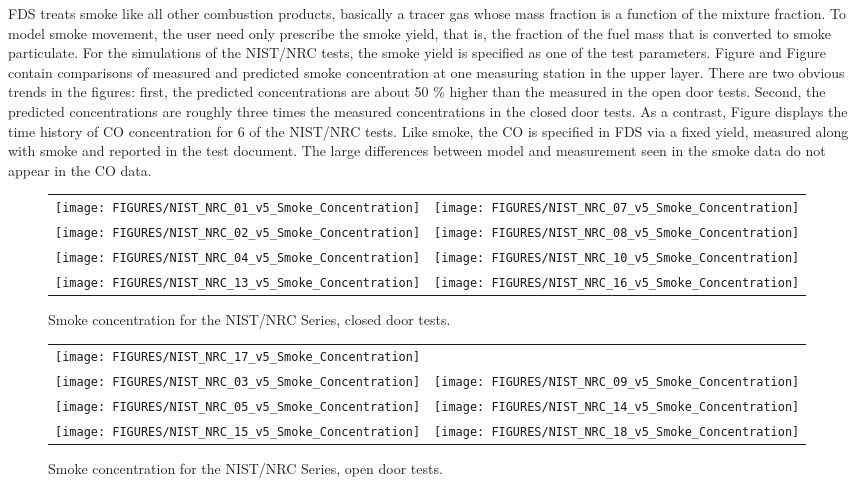FDS treats smoke like all other combustion products, basically a tracer gas whose mass fraction is a function of the mixture fraction.
To model smoke movement, the user need only prescribe the smoke yield, that is, the fraction of the fuel mass that is
converted to smoke particulate.  For the simulations of the NIST/NRC tests, the smoke yield is specified as one of the test parameters.
Figure and Figure contain comparisons of measured and predicted smoke concentration at one measuring station in the upper layer.
There are two obvious trends in the figures: first, the predicted concentrations are about 50 \% higher than the measured
in the open door tests.  Second,
the predicted concentrations are roughly three times the measured concentrations in the closed door tests.
As a contrast, Figure displays the time history of CO concentration for 6 of the NIST/NRC tests.
Like smoke, the CO is specified in FDS via a fixed yield, measured along with smoke and reported in the test document.
The large differences between model and measurement seen in the smoke data do not appear in the CO data.

\begin{figure}[p]
\begin{tabular*}{\textwidth}{l@{\extracolsep{\fill}}r}
\texttt{[image: FIGURES/NIST\_NRC\_01\_v5\_Smoke\_Concentration]} &
\texttt{[image: FIGURES/NIST\_NRC\_07\_v5\_Smoke\_Concentration]} \\
\texttt{[image: FIGURES/NIST\_NRC\_02\_v5\_Smoke\_Concentration]} &
\texttt{[image: FIGURES/NIST\_NRC\_08\_v5\_Smoke\_Concentration]} \\
\texttt{[image: FIGURES/NIST\_NRC\_04\_v5\_Smoke\_Concentration]} &
\texttt{[image: FIGURES/NIST\_NRC\_10\_v5\_Smoke\_Concentration]} \\
\texttt{[image: FIGURES/NIST\_NRC\_13\_v5\_Smoke\_Concentration]} &
\texttt{[image: FIGURES/NIST\_NRC\_16\_v5\_Smoke\_Concentration]}
\end{tabular*}
\caption{Smoke concentration for the NIST/NRC Series, closed door tests.}
\label{NIST_NRC_Smoke_Closed}
\end{figure}

\begin{figure}[p]
\begin{tabular*}{\textwidth}{l@{\extracolsep{\fill}}r}
\texttt{[image: FIGURES/NIST\_NRC\_17\_v5\_Smoke\_Concentration]} &
 \\
\texttt{[image: FIGURES/NIST\_NRC\_03\_v5\_Smoke\_Concentration]} &
\texttt{[image: FIGURES/NIST\_NRC\_09\_v5\_Smoke\_Concentration]} \\
\texttt{[image: FIGURES/NIST\_NRC\_05\_v5\_Smoke\_Concentration]} &
\texttt{[image: FIGURES/NIST\_NRC\_14\_v5\_Smoke\_Concentration]} \\
\texttt{[image: FIGURES/NIST\_NRC\_15\_v5\_Smoke\_Concentration]} &
\texttt{[image: FIGURES/NIST\_NRC\_18\_v5\_Smoke\_Concentration]}
\end{tabular*}
\caption{Smoke concentration for the NIST/NRC Series, open door tests.}
\label{NIST_NRC_Smoke_Open}
\end{figure}

